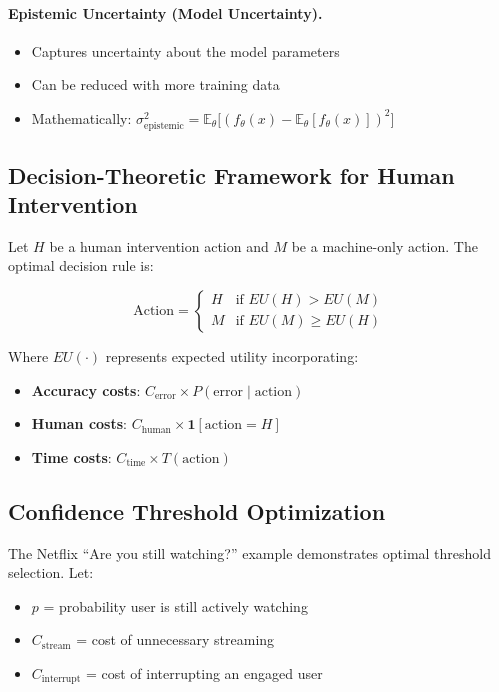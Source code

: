 \paragraph{Epistemic Uncertainty (Model Uncertainty).}
\begin{itemize}
    \item Captures uncertainty about the model parameters
    \item Can be reduced with more training data
    \item Mathematically: $\sigma^2_{\text{epistemic}} = \mathbb{E}_{\theta}\bigl[(f_\theta(x) - \mathbb{E}_{\theta}[f_\theta(x)])^2\bigr]$
\end{itemize}

\subsection{Decision-Theoretic Framework for Human Intervention}
\label{subsec:decision-theoretic}

Let $H$ be a human intervention action and $M$ be a machine-only action. The optimal decision rule is:

\[
\text{Action} = \begin{cases}
H & \text{if } EU(H) > EU(M) \\
M & \text{if } EU(M) \geq EU(H)
\end{cases}
\]

Where $EU(\cdot)$ represents expected utility incorporating:
\begin{itemize}
    \item \textbf{Accuracy costs}: $C_{\text{error}} \times P(\text{error} \mid \text{action})$
    \item \textbf{Human costs}: $C_{\text{human}} \times \mathbf{1}[\text{action} = H]$
    \item \textbf{Time costs}: $C_{\text{time}} \times T(\text{action})$
\end{itemize}

\subsection{Confidence Threshold Optimization}

The Netflix ``Are you still watching?'' example demonstrates optimal threshold selection. Let:
\begin{itemize}
    \item $p$ = probability user is still actively watching
    \item $C_{\text{stream}}$ = cost of unnecessary streaming
    \item $C_{\text{interrupt}}$ = cost of interrupting an engaged user
\end{itemize}

